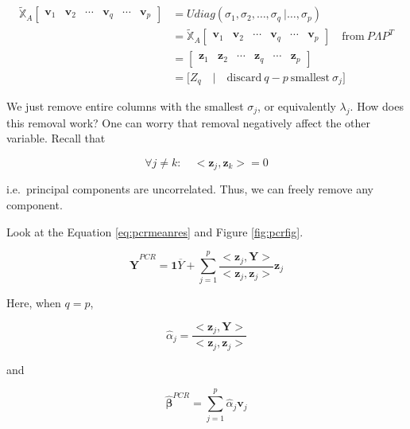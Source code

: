 \documentclass[]{book}
\theoremstyle{definition}
\theoremstyle{definition}
\theoremstyle{definition}
\theoremstyle{remark}
\begin{document}
\begin{equation}
  \begin{split}
    \widetilde{\mathbb{X}}_A \left[\begin{array}{cccc|cc}
      \mathbf{v}_1 & \mathbf{v}_2 & \cdots & \mathbf{v}_q & \cdots & \mathbf{v}_p
    \end{array}\right] & = U diag(\sigma_1, \sigma_2, \ldots, \sigma_q \: \bigg\vert \ldots, \sigma_p ) \\
    & = \widetilde{\mathbb{X}}_A \left[\begin{array}{cccc|cc}
      \mathbf{v}_1 & \mathbf{v}_2 & \cdots & \mathbf{v}_q & \cdots & \mathbf{v}_p
    \end{array}\right] \quad \text{from}\: P\Lambda P^T \\
    & = \left[\begin{array}{cccc|cc}
      \mathbf{z}_1 & \mathbf{z}_2 & \cdots & \mathbf{z}_q & \cdots & \mathbf{z}_p
    \end{array}\right] \\
    & = \Big[ Z_q \quad \Big\vert \quad \text{discard}\: q - p \: \text{smallest}\: \sigma_j \Big]
  \end{split}
  \label{eq:pcrdimred}
\end{equation}

We just remove entire columns with the smallest \(\sigma_j\), or equivalently \(\lambda_j\). How does this removal work? One can worry that removal negatively affect the other variable. Recall that

\[\forall j \neq k : \quad <\mathbf{z}_j, \mathbf{z}_k> = 0\]

i.e.~principal components are uncorrelated. Thus, we can freely remove any component.

Look at the Equation \eqref{eq:pcrmeanres} and Figure \ref{fig:pcrfig}.

\begin{equation}
  \hat{\mathbf{Y}}^{PCR} = \mathbf{1} \overline{Y} + \sum_{j = 1}^p \frac{< \mathbf{z}_j, \mathbf{Y} >}{< \mathbf{z}_j, \mathbf{z}_j >} \mathbf{z}_j
  \label{eq:pcrsimple}
\end{equation}

Here, when \(q = p\),

\[\hat\alpha_j = \frac{< \mathbf{z}_j, \mathbf{Y} >}{< \mathbf{z}_j, \mathbf{z}_j >}\]

and

\[\boldsymbol{\hat\beta}^{PCR} = \sum_{j = 1}^p \hat\alpha_j \mathbf{v}_j\]
\end{document}
